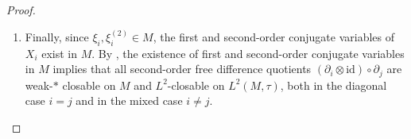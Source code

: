 \documentclass[10pt,a4paper,reqno]{amsart}
\newcommand{\Dom}{\mathrm{Dom}}
\begin{document}
\begin{proof}
\begin{enumerate}
\[
(1\otimes \xi_i)^{\dagger} = \xi_i^\ast \otimes 1 = \xi_i \otimes 1 
\in \Dom(\partial_i^\ast),
\]


and hence
\begin{equation}
    \partial_i^\ast(\xi_i\otimes 1) = \partial_i^\ast(1\otimes \xi_i).
\end{equation}

\medskip

Since $\xi_i$ is self-adjoint, it only remains to check the second term in Voiculescu’s adjoint identity,


\[
\xi_i^{(2)} = \partial_i^\ast(1\otimes \xi_i)
= \xi_i^2 - (\tau\otimes \mathrm{id})\big(\bar\partial_i(\xi_i)\big).
\]


By Mai’s \cite[Lemma~4.6]{Mai} again, for any $u\in \Dom(\partial^\ast)$ one has


\[
(\tau\otimes \mathrm{id})(u)^\ast = (\mathrm{id}\otimes\tau)(u^\dagger).
\]


Applying this to $u=\bar\partial_i(\xi_i)$, and using that $\bar\partial_i$ is a real derivation so that 
$(\bar\partial_i \xi_i)^\dagger = \bar\partial_i(\xi_i^\ast)=\bar\partial_i(\xi_i)$, we deduce


\[
\big((\tau\otimes \mathrm{id})(\bar\partial_i \xi_i)\big)^\ast
= (\mathrm{id}\otimes\tau)(\bar\partial_i(\xi_i))=(\tau\otimes \mathrm{id})(\bar\partial_i\xi_i).
\]


Thus both $(\tau\otimes \mathrm{id})(\bar\partial_i(\xi_i))$ and 
$(\mathrm{id}\otimes\tau)(\bar\partial_i(\xi_i))$ are self-adjoint elements of $M$.

\medskip
  
Since $\xi_i$ is self-adjoint and the correction term 
$(\tau\otimes \mathrm{id})(\bar\partial_i(\xi_i))$ is also self-adjoint, 
it follows that the second-order conjugate variable


\[
\xi_i^{(2)} = \partial_i^\ast(1\otimes \xi_i)\in M
\]


is itself self-adjoint.

\item Finally,
since $\xi_i,\xi_i^{(2)}\in M$, the first and second-order conjugate variables of $X_i$ exist in $M$. By \cite[Lemma~40]{YGS}, the existence of first and second-order conjugate variables in $M$ implies that all second-order free difference quotients $(\partial_i\otimes \mathrm{id})\circ \partial_j$ are weak-$*$ closable on $M$ and $L^2$-closable on $L^2(M,\tau)$, both in the diagonal case $i=j$ and in the mixed case $i\neq j$.
\end{enumerate}
\end{proof}
\end{document}
